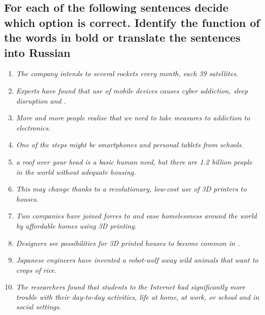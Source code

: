 \subsection*{For each of the following sentences decide which option is correct. Identify the function
      of the words in bold or translate the sentences into Russian}
\begin{enumerate}
      \item \textit{The company intends to \underline{\hspace{2cm}} several rockets every month, each \underline{\hspace{2cm}} 39 satellites.}
      \item \textit{Experts have found that \underline{\hspace{2cm}} use of mobile devices causes cyber addiction, sleep disruption and \underline{\hspace{2cm}}.}
      \item \textit{More and more people realise that we need to take measures to \underline{\hspace{2cm}} addiction to electronics.}
      \item \textit{One of the steps might be \underline{\hspace{2cm}} smartphones and personal tablets from schools.}
      \item \textit{\underline{\hspace{2cm}} a roof over your head is a basic human need, but there are 1.2 billion people in the world without adequate housing.}
      \item \textit{This may change thanks to a revolutionary, low-cost use of 3D printers to \underline{\hspace{2cm}} houses.}
      \item \textit{Two companies have joined forces to \underline{\hspace{2cm}} and ease homelessness around the world by \underline{\hspace{2cm}} affordable homes using 3D printing.}
      \item \textit{Designers see possibilities for 3D printed houses to become common in \underline{\hspace{2cm}}.}
      \item \textit{Japanese engineers have invented a robot-wolf \underline{\hspace{2cm}} away wild animals that want to \underline{\hspace{2cm}} crops of rice.}
      \item \textit{The researchers found that students \underline{\hspace{2cm}} to the Internet had significantly more trouble \underline{\hspace{2cm}} with their day-to-day activities, \underline{\hspace{2cm}} life at home, at work, or school and in social settings.}

\end{enumerate}
